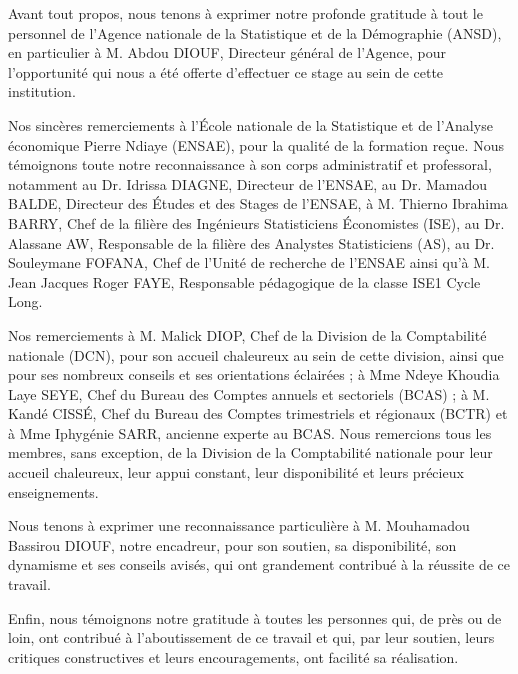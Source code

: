 \documentclass[12pt,a4paper]{report}
\begin{document}
Avant tout propos, nous tenons à exprimer notre profonde gratitude à tout le personnel de l’Agence nationale de la Statistique et de la Démographie (ANSD), en particulier à M. Abdou DIOUF, Directeur général de l’Agence, pour l’opportunité qui nous a été offerte d’effectuer ce stage au sein de cette institution.

Nos sincères remerciements à l'École nationale de la Statistique et de l'Analyse économique Pierre Ndiaye (ENSAE), pour la qualité de la formation reçue. Nous témoignons toute notre reconnaissance à son corps administratif et professoral, notamment au Dr. Idrissa DIAGNE, Directeur de l’ENSAE, au Dr. Mamadou BALDE, Directeur des Études et des Stages de l’ENSAE, à M. Thierno Ibrahima BARRY, Chef de la filière des Ingénieurs Statisticiens Économistes (ISE), au Dr. Alassane AW, Responsable de la filière des Analystes Statisticiens (AS), au Dr. Souleymane FOFANA, Chef de l’Unité de recherche de l’ENSAE ainsi qu’à M. Jean Jacques Roger FAYE, Responsable pédagogique de la classe ISE1 Cycle Long.

Nos remerciements à M. Malick DIOP, Chef de la Division de la Comptabilité nationale (DCN), pour son accueil chaleureux au sein de cette division, ainsi que pour ses nombreux conseils et ses orientations éclairées ; à Mme Ndeye Khoudia Laye SEYE, Chef du Bureau des Comptes annuels et sectoriels (BCAS) ; à M. Kandé CISSÉ, Chef du Bureau des Comptes trimestriels et régionaux (BCTR) et à Mme Iphygénie SARR, ancienne experte au BCAS. Nous remercions tous les membres, sans exception, de la Division de la Comptabilité nationale pour leur accueil chaleureux, leur appui constant, leur disponibilité et leurs précieux enseignements.

Nous tenons à exprimer une reconnaissance particulière à M. Mouhamadou Bassirou DIOUF, notre encadreur, pour son soutien, sa disponibilité, son dynamisme et ses conseils avisés, qui ont grandement contribué à la réussite de ce travail.

Enfin, nous témoignons notre gratitude à toutes les personnes qui, de près ou de loin, ont contribué à l'aboutissement de ce travail et qui, par leur soutien, leurs critiques constructives et leurs encouragements, ont facilité sa réalisation.

\end{document}
